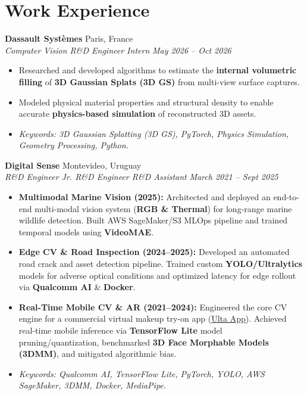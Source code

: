 \documentclass[10pt, a4paper]{article}
\newcommand{\entryheader}[4]{
    \noindent \textbf{#1} \hfill #2 \\
    \textit{#3} \hfill \textit{#4} \vspace{1pt}
}
\begin{document}
\section{Work Experience}

\entryheader{Dassault Systèmes}{Paris, France}{Computer Vision R\&D Engineer Intern}{May 2026 -- Oct 2026}
\begin{itemize}
    \item Researched and developed algorithms to estimate the \textbf{internal volumetric filling} of \textbf{3D Gaussian Splats (3D GS)} from multi-view surface captures.
    \item Modeled physical material properties and structural density to enable accurate \textbf{physics-based simulation} of reconstructed 3D assets.
    \item \textit{Keywords: 3D Gaussian Splatting (3D GS), PyTorch, Physics Simulation, Geometry Processing, Python.}
\end{itemize}
\vspace{3pt}

\entryheader{Digital Sense}{Montevideo, Uruguay}{R\&D Engineer \textbar{} Jr. R\&D Engineer \textbar{} R\&D Assistant}{March 2021 -- Sept 2025}
\begin{itemize}
    \item \textbf{Multimodal Marine Vision (2025):} Architected and deployed an end-to-end multi-modal vision system (\textbf{RGB \& Thermal}) for long-range marine wildlife detection. Built AWS SageMaker/S3 MLOps pipeline and trained temporal models using \textbf{VideoMAE}.
    \item \textbf{Edge CV \& Road Inspection (2024--2025):} Developed an automated road crack and asset detection pipeline. Trained custom \textbf{YOLO/Ultralytics} models for adverse optical conditions and optimized latency for edge rollout via \textbf{Qualcomm AI} \& \textbf{Docker}.
    \item \textbf{Real-Time Mobile CV \& AR (2021--2024):} Engineered the core CV engine for a commercial virtual makeup try-on app (\href{https://www.ulta.com/company/app?srsltid=AfmBOorrV_A9GKMtuqNiCTeg1_JPuXVPm-JVckez5tHgEYyQP1o90QxV}{Ulta App}). Achieved real-time mobile inference via \textbf{TensorFlow Lite} model pruning/quantization, benchmarked \textbf{3D Face Morphable Models (3DMM)}, and mitigated algorithmic bias.
    \item \textit{Keywords: Qualcomm AI, TensorFlow Lite, PyTorch, YOLO, AWS SageMaker, 3DMM, Docker, MediaPipe.}
\end{itemize}
\end{document}
